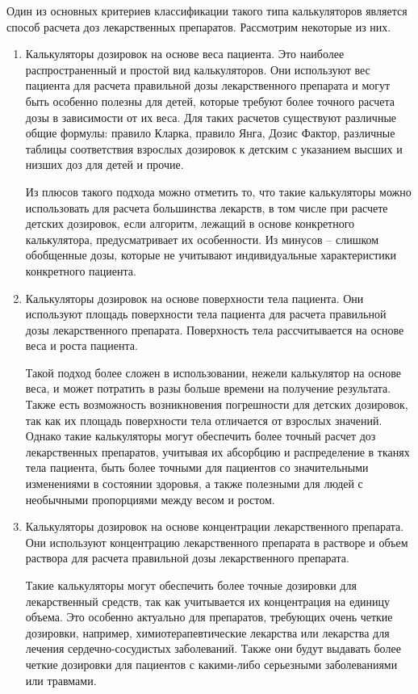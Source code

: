 Один из основных критериев классификации такого типа калькуляторов является способ расчета доз лекарственных препаратов. Рассмотрим некоторые из них.
\begin{enumerate}
\item Калькуляторы дозировок на основе веса пациента. Это наиболее распространенный и простой вид калькуляторов. Они используют вес пациента для расчета правильной дозы лекарственного препарата и могут быть особенно полезны для детей, которые требуют более точного расчета дозы в зависимости от их веса. Для таких расчетов существуют различные общие формулы: правило Кларка, правило Янга, Дозис Фактор, различные таблицы соответствия взрослых дозировок к детским с указанием высших и низших доз для детей и прочие.

Из плюсов такого подхода можно отметить то, что такие калькуляторы можно использовать для расчета большинства лекарств, в том числе при расчете детских дозировок, если алгоритм, лежащий в основе конкретного калькулятора, предусматривает их особенности. Из минусов -- слишком обобщенные дозы, которые не учитывают индивидуальные характеристики конкретного пациента.

\item  Калькуляторы дозировок на основе поверхности тела пациента. Они используют площадь поверхности тела пациента для расчета правильной дозы лекарственного препарата. Поверхность тела рассчитывается на основе веса и роста пациента.

Такой подход более сложен в использовании, нежели калькулятор на основе веса, и может потратить в разы больше времени на получение результата. Также есть возможность возникновения погрешности для детских дозировок, так как их площадь поверхности тела отличается от взрослых значений. Однако такие калькуляторы могут обеспечить более точный расчет доз лекарственных препаратов, учитывая их абсорбцию и распределение в тканях тела пациента, быть более точными для пациентов со значительными изменениями в состоянии здоровья, а также полезными для людей с необычными пропорциями между весом и ростом.

\item Калькуляторы дозировок на основе концентрации лекарственного препарата. Они используют концентрацию лекарственного препарата в растворе и объем раствора для расчета правильной дозы лекарственного препарата.

Такие калькуляторы могут обеспечить более точные дозировки для лекарственный средств, так как учитывается их концентрация на единицу объема. Это особенно актуально для препаратов, требующих очень четкие дозировки, например, химиотерапевтические лекарства или лекарства для лечения  сердечно-сосудистых заболеваний.  Также они будут выдавать более четкие дозировки для пациентов с какими-либо серьезными заболеваниями или травмами.


\end{enumerate}
